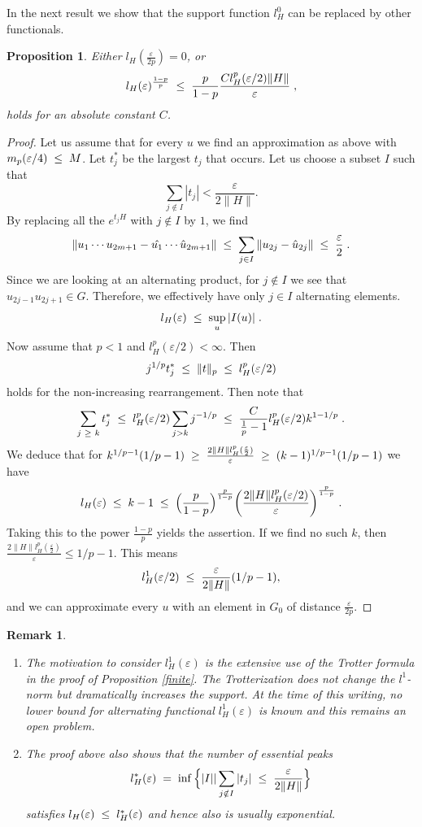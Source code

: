 \documentclass[12pt, a4-paper]{amsart}
\numberwithin{equation}{section}
\newcommand{\kl}{\pl \le \pl}
\newcommand{\gl}{\pl \ge \pl}
\newcommand{\lel}{\pl = \pl}
\newcommand{\pl}{\hspace{.1cm}}
\newcommand{\eps}{\varepsilon}
\newtheorem{rem}[lemma]{Remark}
\newtheorem{prop}[lemma]{Proposition}
\begin{document}
In the next result we show that the support function $l_H^0$ can be replaced by other functionals.

 \begin{prop}\label{mp} Either $l_H(\frac{\eps}{2p})=0$, or 
 \[ l_H(\eps)^{\frac{1-p}{p}} \kl \frac{p}{1-p} \frac{Cl_H^p(\eps/2)\|H\|}{\eps}  \pl, \]
 holds for an absolute constant $C$.   
\end{prop} 

\begin{proof} Let us assume that for every $u$ we find an approximation as above with $m_p(\eps/4)\kl M$. Let $t_j^*$ be the largest $t_j$ that occurs. Let us choose a subset $I$ such that  
 \[ \sum_{j\notin I} |t_j|<\frac{\eps}{2\|H\|}. \] 
By replacing all the $e^{t_jH}$ with $j\notin I$ by $1$, we find
 \[ \|u_1\cdots u_{2m+1}-\hat{u_1}\cdots \hat{u}_{2m+1}\|
 \kl \sum_{j\in I} \|u_{2j}-\hat{u}_{2j}\| \kl \frac{\eps}{2} \pl .\] 
Since we are looking at an alternating product, for $j\notin I$ we see that $u_{2j-1}u_{2j+1}\in G$. Therefore, we effectively have only $j\in I$ alternating elements. 
 \[ l_{H}(\eps) \kl \sup_u |I(u)| \pl .\] 
Now assume that $p<1$ and $l_{H}^p(\eps/2)<
\infty$. Then
 \[ j^{1/p}t_j^* \kl \|t\|_p \kl l_{H}^p(\eps/2)  \] 
holds for the non-increasing rearrangement. Then note that 
 \[ \sum_{j\gl k} t_j^* \kl   l_{H}^p(\eps/2) \sum_{j>k} j^{-1/p} 
 \kl \frac{C}{\frac{1}{p}-1}  l_{H}^p(\eps/2) k^{1-1/p} \pl .\] 
We deduce that for $k^{1/p-1}(1/p-1)\gl \frac{2\|H\| l_H^p(\frac{\eps}{2})}{\eps}\gl (k-1)^{1/p-1}(1/p-1)$ we have
 \[ l_H(\eps) \kl k-1 \kl  \Big(\frac{p}{1-p}\Big)^{\frac{p}{1-p}} \bigg(\frac{2\|H\|l_H^p(\eps/2)}{\eps}\bigg)^{\frac{p}{1-p}}  \pl . \]    
Taking this to the power $\frac{1-p}{p}$ yields the assertion. If we find no such $k$, then $\frac{2\|H\|l_H^p(\frac{\eps}{2})}{\eps}\le 1/p-1$. This means
 \[ l_H^1(\eps/2) \kl \frac{\eps}{2\|H\|}(1/p-1), \]
and we can approximate every $u$ with an element in $G_0$ of distance $\frac{\eps}{2p}$.  
\end{proof}  

\begin{rem}
\begin{enumerate}
\item[i)] The motivation to consider $l_H^1(\eps)$ is the extensive use of the Trotter formula in the proof of Proposition \ref{finite}. The Trotterization does not change the $l^1$-norm but dramatically increases the support. At the time of this writing, no lower bound for alternating functional $l_H^1(\eps)$ is known and this remains an open problem. 
\item[ii)] The proof above also shows that the number of essential peaks
 \[ l_H^*(\eps) \lel \inf \Big\{|I| | \sum_{j\notin I} |t_j|\kl \frac{\eps}{2\|H\|}  \Big\} 
 \] 
satisfies $l_H(\eps)\kl l_H^*(\eps)$ and hence also is usually exponential. 
\end{enumerate}   
\end{rem} 
\end{document}
